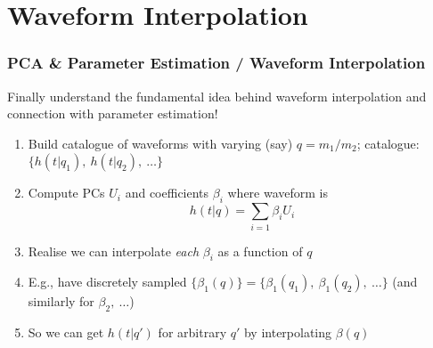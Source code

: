 \documentclass{beamer}
\begin{document}
\section{Waveform Interpolation}

\begin{frame}
    \frametitle{PCA \& Parameter Estimation / Waveform Interpolation}
    Finally understand the fundamental idea behind waveform interpolation and
    connection with parameter estimation!
    \begin{enumerate}
        \item Build catalogue of waveforms with varying (say) $q=m_1/m_2$;
            catalogue: $\{h(t|q_1),~h(t|q_2),~\dots\}$
        \item Compute PCs $U_i$ and coefficients $\beta_i$ where waveform is
            \begin{equation}
                h(t|q) = \sum_{i=1} \beta_i U_i
            \end{equation}
        \item Realise we can interpolate \emph{each} $\beta_i$ as a function of
            $q$
        \item E.g., have discretely sampled $\{\beta_1(q)\} = \{\beta_1(q_1),~
            \beta_1(q_2),~\dots\}$ (and similarly for $\beta_2,~\dots$)
        \item So we can get $h(t|q')$ for arbitrary $q'$ by interpolating
            $\beta(q)$
    \end{enumerate}

\end{frame}
\end{document}
